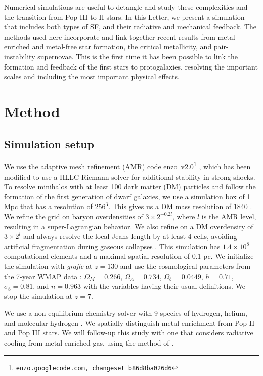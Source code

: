 \documentclass[12pt,preprint]{aastex}
\newcommand{\Ms}{\ifmmode{M_\odot}\else{$M_\odot$}\fi}
\begin{document}
Numerical simulations are useful to detangle and study these
complexities and the transition from Pop III to II stars.  In this
Letter, we present a simulation that includes both types of SF, and
their radiative and mechanical feedback.  The methods used here
incorporate and link together recent results from metal-enriched and
metal-free star formation, the critical metallicity, and
pair-instability supernovae.  This is the first time it has been
possible to link the formation and feedback of the first stars to
protogalaxies, resolving the important scales and including the most
important physical effects.

\section{Method}
\label{sec:setup}

\subsection{Simulation setup}

We use the adaptive mesh refinement (AMR) code
enzo~v2.0\footnote{\texttt{enzo.googlecode.com, changeset
    b86d8ba026d6}} \citep{OShea2004}, which has been modified to use a
HLLC Riemann solver \citep{Toro94_HLLC} for additional stability in
strong shocks.  To resolve minihalos with at least 100 dark matter
(DM) particles and follow the formation of the first generation of
dwarf galaxies, we use a simulation box of 1 Mpc that has a resolution
of $256^3$.  This gives us a DM mass resolution of 1840 \Ms.  We
refine the grid on baryon overdensities of $3 \times 2^{-0.2l}$, where
$l$ is the AMR level, resulting in a super-Lagrangian behavior.  We
also refine on a DM overdensity of $3 \times 2^l$ and always resolve
the local Jeans length by at least 4 cells, avoiding artificial
fragmentation during gaseous collapses \citep{Truelove97}.  This
simulation has $1.4 \times 10^8$ computational elements and a maximal
spatial resolution of 0.1 pc.  We initialize the simulation with
\textsl{grafic} \citep{Bertschinger01} at $z = 130$ and use the
cosmological parameters from the 7-year WMAP data \citep{WMAP7}:
$\Omega_M = 0.266$, $\Omega_\Lambda = 0.734$, $\Omega_b = 0.0449$, $h
= 0.71$, $\sigma_8 = 0.81$, and $n = 0.963$ with the variables having
their usual definitions.  We stop the simulation at $z=7$.

We use a non-equilibrium chemistry solver with 9 species of hydrogen,
helium, and molecular hydrogen \citep{Abel97}.  We spatially
distinguish metal enrichment from Pop II and Pop III stars.  We will
follow-up this study with one that considers radiative cooling from
metal-enriched gas, using the method of \citet{2008MNRAS.385.1443S}.
\end{document}
